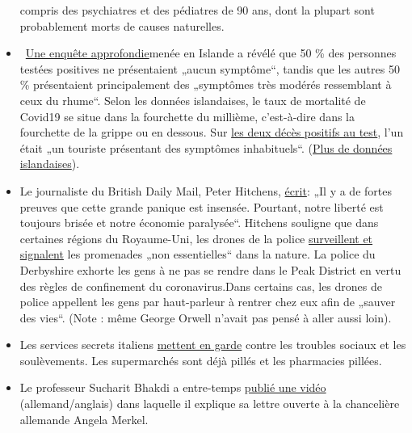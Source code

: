 \begin{itemize}
  compris des psychiatres et des pédiatres de 90 ans, dont la plupart
  sont probablement morts de causes naturelles.
\item
  ~\href{https://www.buzzfeed.com/albertonardelli/coronavirus-testing-iceland}{Une
  enquête approfondie}menée en Islande a révélé que 50 \% des personnes
  testées positives ne présentaient „aucun symptôme``, tandis que les
  autres 50 \% présentaient principalement des „symptômes très modérés
  ressemblant à ceux du rhume``. Selon les données islandaises, le taux
  de mortalité de Covid19 se situe dans la fourchette du millième,
  c'est-à-dire dans la fourchette de la grippe ou en dessous. Sur
  \href{https://www.government.is/news/article/?newsid=c65cf658-6eb6-11ea-9462-005056bc4d74}{les
  deux décès positifs au test}, l'un était „un touriste présentant des
  symptômes inhabituels``. (\href{https://www.covid.is/data}{Plus de
  données islandaises}).
\item
  Le journaliste du British Daily Mail, Peter Hitchens,
  \href{https://hitchensblog.mailonsunday.co.uk/2020/03/theres-powerful-evidence-this-great-panic-is-foolish-yet-our-freedom-is-still-broken-and-our-economy.html}{écrit}:
  „Il y a de fortes preuves que cette grande panique est insensée.
  Pourtant, notre liberté est toujours brisée et notre économie
  paralysée``. Hitchens souligne que dans certaines régions du
  Royaume-Uni, les drones de la police
  \href{https://www.youtube.com/watch?v=fHNxDzLsPeg}{surveillent et
  signalent} les promenades „non essentielles`` dans la nature. La
  police du Derbyshire exhorte les gens à ne pas se rendre dans le Peak
  District en vertu des règles de confinement du coronavirus.Dans
  certains cas, les drones de police appellent les gens par haut-parleur
  à rentrer chez eux afin de „sauver des vies``. (Note : même George
  Orwell n'avait pas pensé à aller aussi loin).
\item
  Les services secrets italiens
  \href{https://www.focus.de/panorama/welt/sorge-vor-sozialen-unruhen-supermaerkte-gepluendert-apotheken-ueberfallen-italiens-geheimdienst-warnt-vor-aufstaenden_id_11826664.html}{mettent
  en garde} contre les troubles sociaux et les soulèvements. Les
  supermarchés sont déjà pillés et les pharmacies pillées.
\item
  Le professeur Sucharit Bhakdi a entre-temps
  \href{https://www.youtube.com/watch?v=LsExPrHCHbw\&feature=emb_title}{publié
  une vidéo} (allemand/anglais) dans laquelle il explique sa lettre
  ouverte à la chancelière allemande Angela Merkel.
\end{itemize}

